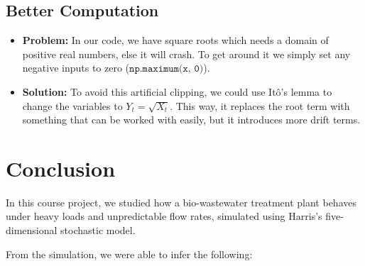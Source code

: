 \documentclass[conference]{IEEEtran}
\renewcommand{\smallskip}{\vspace{0.5\baselineskip}}
\theoremstyle{definitionsc}
\theoremstyle{plainsc}
\theoremstyle{remarksc}
\begin{document}
\smallskip




\subsection{\textbf{Better Computation}}

\begin{itemize}
	\item \textbf{Problem:} In our code, we have square roots which needs a domain of positive real numbers, else it will crash. To get around it we simply set any negative inputs to zero ($\texttt{np.maximum(x, 0)}$).

	\item \textbf{Solution:} To avoid this artificial clipping, we could use Itô's lemma \cite{dereich} to change the variables to $Y_t = \sqrt{X_t}$. This way, it replaces the root term with something that can be worked with easily, but it introduces more drift terms.
	
\end{itemize}





















\section{Conclusion}

In this course project, we studied how a bio-wastewater treatment plant behaves under heavy loads and unpredictable flow rates, simulated using Harris's five-dimensional stochastic model.

From the simulation, we were able to infer the following:
\end{document}
